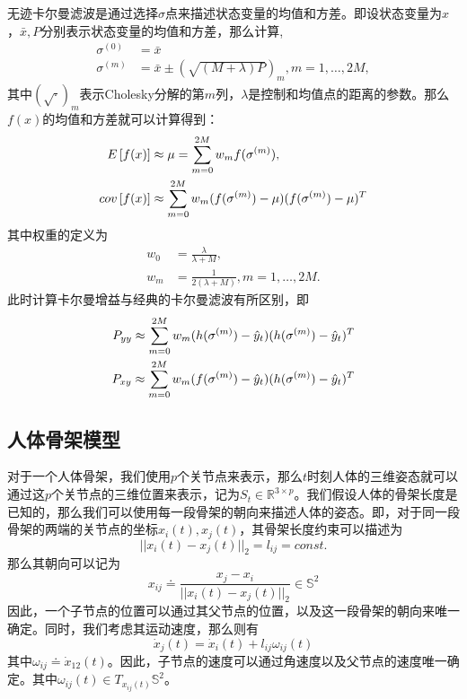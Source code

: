 无迹卡尔曼滤波是通过选择$\sigma$点来描述状态变量的均值和方差。即设状态变量为$x$，$\bar{x},P$分别表示状态变量的均值和方差，那么计算\sigp,
\begin{align}
    \sigma^{(0)} &= \bar{x} \\
    \sigma^{(m)} &= \bar{x} \pm \left(\sqrt{(M+\lambda)P}\right)_m,m=1,\ldots,2M,
\end{align}
其中$(\sqrt{\cdot})_m$表示Cholesky分解的第$m$列，$\lambda$是控制\sigp 和均值点的距离的参数。那么$f(x)$的均值和方差就可以计算得到：
\begin{align}
    E\left[f(x)\right] &\approx \mu = \sum_{m=0}^{2M}w_m f(\sigma^{(m)}),\\
    cov\left[f(x)\right] &\approx \sum_{m=0}^{2M}w_m (f(\sigma^{(m)}) - \mu)(f(\sigma^{(m)}) - \mu)^T
\end{align}
其中权重的定义为
\begin{align}
    w_0 &= \frac{\lambda}{\lambda+M},\\
    w_m &= \frac{1}{2(\lambda + M)},m = 1,\ldots,2M.
\end{align}
此时计算卡尔曼增益与经典的卡尔曼滤波有所区别，即
\begin{align}
    P_{yy} \approx \sum_{m=0}^{2M}w_m(h(\sigma^{(m)}) - \hat{y}_t)(h(\sigma^{(m)}) - \hat{y}_t)^T \\
    P_{xy} \approx \sum_{m=0}^{2M}w_m(f(\sigma^{(m)}) - \hat{y}_t)(h(\sigma^{(m)}) - \hat{y}_t)^T 
\end{align}

\subsection{人体骨架模型}
对于一个人体骨架，我们使用$p$个关节点来表示，那么$t$时刻人体的三维姿态就可以通过这$p$个关节点的三维位置来表示，记为$S_t \in \mathbb{R}^{3\times p}$。我们假设人体的骨架长度是已知的，那么我们可以使用每一段骨架的朝向来描述人体的姿态。即，对于同一段骨架的两端的关节点的坐标$x_i(t),x_j(t)$，其骨架长度约束可以描述为
\begin{equation}
    ||x_i(t) - x_j(t)||_2 = l_{ij} = const.
\end{equation}
那么其朝向可以记为
\begin{equation}
    x_{ij} \doteq \frac{x_j-x_i}{||x_i(t) - x_j(t)||_2} \in \mathbb{S}^2
\end{equation}
因此，一个子节点的位置可以通过其父节点的位置，以及这一段骨架的朝向来唯一确定。同时，我们考虑其运动速度，那么则有
\begin{equation}
    \dot{x}_j(t) = \dot{x}_i(t) + l_{ij}\omega_{ij}(t) 
\end{equation}
其中$\omega_{ij} \doteq \dot{x}_{12}(t)$。因此，子节点的速度可以通过角速度以及父节点的速度唯一确定。其中$\omega_{ij}(t)\in T_{x_{ij}(t)}\mathbb{S}^2$。

